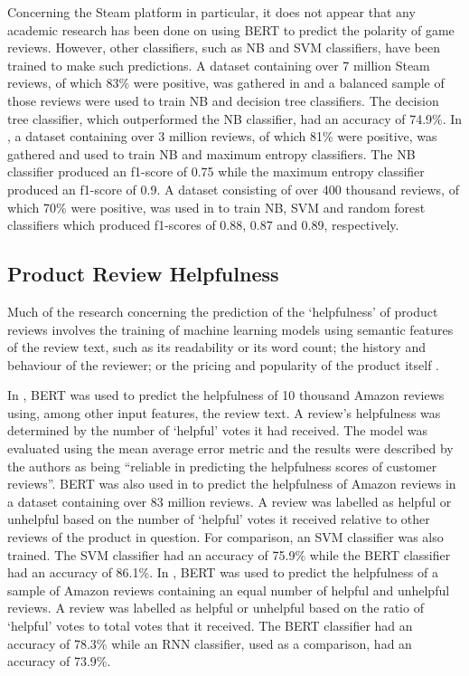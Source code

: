 Concerning the Steam platform in particular, it does not appear that any academic research has been done on using BERT to predict the polarity of game reviews. However, other classifiers, such as NB and SVM classifiers, have been trained to make such predictions. A dataset containing over 7 million Steam reviews, of which 83\% were positive, was gathered in \cite{zuo2018sentiment} and a balanced sample of those reviews were used to train NB and decision tree classifiers. The decision tree classifier, which outperformed the NB classifier, had an accuracy of 74.9\%. In \cite{sobkowicz2016steam}, a dataset containing over 3 million reviews, of which 81\% were positive, was gathered and used to train NB and maximum entropy classifiers. The NB classifier produced an f1-score of 0.75 while the maximum entropy classifier produced an f1-score of 0.9. A dataset consisting of over 400 thousand reviews, of which 70\% were positive, was used in \cite{miao2021compare} to train NB, SVM and random forest classifiers which produced f1-scores of 0.88, 0.87 and 0.89, respectively.

\subsection{Product Review Helpfulness} \label{sec:LR_NLP_Help}

Much of the research concerning the prediction of the `helpfulness' of product reviews involves the training of machine learning models using semantic features of the review text, such as its readability or its word count; the history and behaviour of the reviewer; or the pricing and popularity of the product itself \cite{yang2015semantic} \cite{lee2014predicting} \cite{zhang2018predicting}.

In \cite{xu2020bert}, BERT was used to predict the helpfulness of 10 thousand Amazon reviews using, among other input features, the review text. A review's helpfulness was determined by the number of `helpful' votes it had received. The model was evaluated using the mean average error metric and the results were described by the authors as being ``reliable in predicting the helpfulness scores of customer reviews''. BERT was also used in \cite{alsmadi2020predicting} to predict the helpfulness of Amazon reviews in a dataset containing over 83 million reviews. A review was labelled as helpful or unhelpful based on the number of `helpful' votes it received relative to other reviews of the product in question. For comparison, an SVM classifier was also trained. The SVM classifier had an accuracy of 75.9\% while the BERT classifier had an accuracy of 86.1\%. In \cite{wang2020study}, BERT was used to predict the helpfulness of a sample of Amazon reviews containing an equal number of helpful and unhelpful reviews. A review was labelled as helpful or unhelpful based on the ratio of `helpful' votes to total votes that it received. The BERT classifier had an accuracy of 78.3\% while an RNN classifier, used as a comparison, had an accuracy of 73.9\%.

